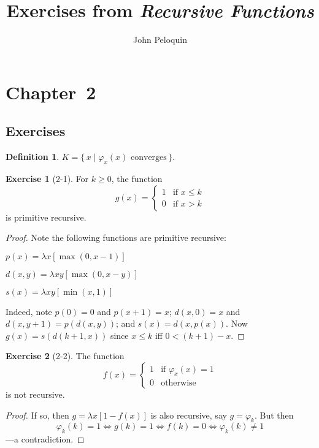 \documentclass[letterpaper]{article}
\title{Exercises from \emph{Recursive Functions}}
\author{John Peloquin}
\date{}
\theoremstyle{definition}
\newtheorem*{defn}{Definition}
\newtheorem*{exer}{Exercise}
\theoremstyle{remark}
\theoremstyle{direction}
\begin{document}
\maketitle

\section*{Chapter~2}

\subsection*{Exercises}
\begin{defn}
$K=\{\,x\mid\varphi_x(x)\text{ converges}\,\}$.
\end{defn}

\begin{exer}[2-1]
For $k\ge0$, the function
$$g(x)=
\begin{cases}
1&\text{if }x\le k\\
0&\text{if }x>k
\end{cases}$$
is primitive recursive.
\end{exer}
\begin{proof}
Note the following functions are primitive recursive:
\begin{description}[itemsep=0pt]
\item[Predecessor (truncated)] $p(x)=\lambda x[\max(0,x-1)]$
\item[Difference (truncated)] $d(x,y)=\lambda xy[\max(0,x-y)]$
\item[Signal] $s(x)=\lambda xy[\min(x,1)]$
\end{description}
Indeed, note $p(0)=0$ and $p(x+1)=x$; $d(x,0)=x$ and $d(x,y+1)=p(d(x,y))$; and $s(x)=d(x,p(x))$. Now $g(x)=s(d(k+1,x))$ since $x\le k$ iff $0<(k+1)-x$.
\end{proof}

\begin{exer}[2-2]
The function
$$f(x)=
\begin{cases}
1&\text{if }\varphi_x(x)=1\\
0&\text{otherwise}
\end{cases}$$
is not recursive.
\end{exer}
\begin{proof}
If so, then $g=\lambda x[1-f(x)]$ is also recursive, say $g=\varphi_k$. But then
$$\varphi_k(k)=1\iff g(k)=1\iff f(k)=0\iff\varphi_k(k)\ne 1$$
---a contradiction.
\end{proof}
\end{document}
